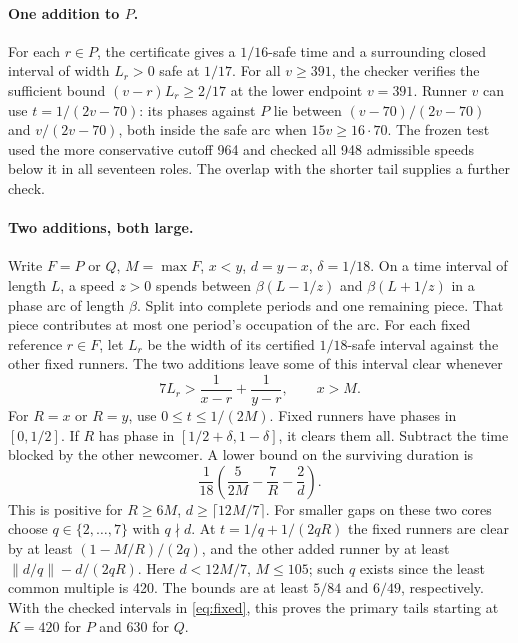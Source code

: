 \documentclass[11pt,letterpaper]{article}
\newcommand{\dist}[1]{\left\lVert #1\right\rVert}
\begin{document}
\paragraph{One addition to \(P\).}
For each \(r\in P\), the certificate gives a \(1/16\)-safe time and a surrounding closed interval of width \(L_r>0\) safe at \(1/17\). For all \(v\ge391\), the checker verifies the sufficient bound \((v-r)L_r\ge2/17\) at the lower endpoint \(v=391\). Runner \(v\) can use \(t=1/(2v-70)\): its phases against \(P\) lie between \((v-70)/(2v-70)\) and \(v/(2v-70)\), both inside the safe arc when \(15v\ge16\cdot70\). The frozen test used the more conservative cutoff 964 and checked all 948 admissible speeds below it in all seventeen roles. The overlap with the shorter tail supplies a further check.

\paragraph{Two additions, both large.}
Write \(F=P\) or \(Q\), \(M=\max F\), \(x<y\), \(d=y-x\), \(\delta=1/18\). On a time interval of length \(L\), a speed \(z>0\) spends between \(\beta(L-1/z)\) and \(\beta(L+1/z)\) in a phase arc of length \(\beta\). Split into complete periods and one remaining piece. That piece contributes at most one period's occupation of the arc. For each fixed reference \(r\in F\), let \(L_r\) be the width of its certified \(1/18\)-safe interval against the other fixed runners. The two additions leave some of this interval clear whenever
\begin{equation}\label{eq:fixed}
7L_r>\frac1{x-r}+\frac1{y-r},\qquad x>M .
\end{equation}
For \(R=x\) or \(R=y\), use \(0\le t\le 1/(2M)\). Fixed runners have phases in \([0,1/2]\). If \(R\) has phase in \([1/2+\delta,1-\delta]\), it clears them all. Subtract the time blocked by the other newcomer. A lower bound on the surviving duration is
\begin{equation}\label{eq:duration}
\frac1{18}\left(\frac5{2M}-\frac7R-\frac2d\right).
\end{equation}
This is positive for \(R\ge6M\), \(d\ge\lceil12M/7\rceil\). For smaller gaps on these two cores choose \(q\in\{2,\ldots,7\}\) with \(q\nmid d\). At \(t=1/q+1/(2qR)\) the fixed runners are clear by at least \((1-M/R)/(2q)\), and the other added runner by at least \(\dist{d/q}-d/(2qR)\). Here \(d<12M/7\), \(M\le105\); such \(q\) exists since the least common multiple is 420. The bounds are at least \(5/84\) and \(6/49\), respectively. With the checked intervals in \eqref{eq:fixed}, this proves the primary tails starting at \(K=420\) for \(P\) and \(630\) for \(Q\).
\end{document}
